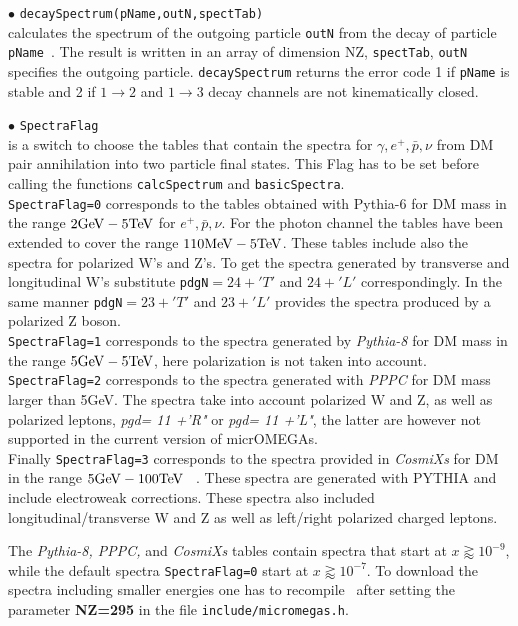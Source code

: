 \documentclass[12pt,a4paper]{article}
\begin{document}
\noindent
$\bullet$ \verb|decaySpectrum(pName,outN,spectTab)|\\
calculates the spectrum of the outgoing particle  {\tt  outN} from the decay of particle {\tt pName }.  The result is written in an array of dimension NZ, \verb|spectTab|, {\tt  outN}  specifies the outgoing particle.  {\tt decaySpectrum} returns  the  error code 1  if  {\tt pName} is stable and 2 if  $1\to 2$ and  $1\to 3$ decay channels are not kinematically closed.



\noindent
$\bullet$   \verb|SpectraFlag| \\
is a switch to choose the tables that contain the spectra  for $\gamma,e^+,\bar{p},\nu$ from DM pair annihilation into two particle final states. This Flag has to be set before calling the functions {\tt calcSpectrum} and {\tt basicSpectra}. 
 \\
{\tt SpectraFlag=0} corresponds to the tables obtained with  Pythia-6 \cite{Belanger:2010gh}  for  DM mass in the range  $2{\rm  GeV} - 5{\rm TeV}$ for $e^+,\bar{p},\nu$. 
For the photon channel the tables  have  been extended to cover the range $110 {\rm MeV} - 5{\rm TeV}$.
These tables include also the spectra for polarized W's and Z's.
To get the spectra generated by transverse and longitudinal W's substitute 
\verb|pdgN|$=24+'T'$ and $24+'L'$ correspondingly. In the same manner \verb|pdgN|$=23+'T'$ and
$23+'L'$  provides the spectra produced by a polarized Z boson.\\
{\tt SpectraFlag=1} corresponds to the spectra generated by {\it Pythia-8} \cite{Amoroso:2018qga, Jueid:2022qjg} for DM mass in the range  $5{\rm  GeV} - 5{\rm TeV}$, here polarization is not taken into account.\\
{\tt SpectraFlag=2} corresponds to the 
 spectra generated with {\it PPPC}  \cite{Ciafaloni_2011,Marco_Cirelli_2011} for DM mass larger than 5GeV. The spectra take into account polarized W and Z,  as well as
polarized leptons, {\it  pgd= 11 +'R"} or {\it  pgd= 11 +'L"},  the latter are however not supported
in the current version of micrOMEGAs.\\
Finally {\tt SpectraFlag=3} corresponds to the  spectra  provided in  {\it CosmiXs} for DM in the range  $5{\rm  GeV} - 100{\rm TeV}$ ~\cite{Arina:2023eic}. These spectra are generated with PYTHIA and include electroweak corrections. These  spectra also included longitudinal/transverse  W and Z  as well as  left/right polarized  charged leptons.

The { \it Pythia-8, PPPC,} and {\it CosmiXs} tables contain spectra that start at  $x \gtrapprox 10^{-9}$, while the default spectra {\tt SpectraFlag=0} start at  $x \gtrapprox 10^{-7}$. To download  the  spectra including  smaller energies one has 
to recompile \micro\ after setting the  parameter  {\bf NZ=295}  in the  file {\tt include/micromegas.h}. 
\end{document}
